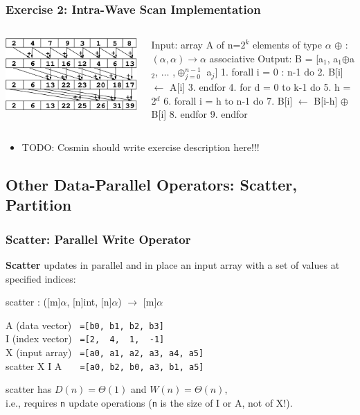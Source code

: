 \documentclass{beamer}
\renewcommand{\emph}[1]{\textcolor{CosGreen}{ #1}}
\newcommand{\emp}[1]{\textcolor{DikuRed}{ #1}}
\newcommand{\mymath}[1]{$ #1 $}
\newcommand{\myindx}[1]{_{#1}}
\newcommand{\myindu}[1]{^{#1}}
\begin{document}
\begin{frame}[fragile,t]
  \frametitle{Exercise 2: Intra-Wave Scan Implementation}

\begin{columns}
\includegraphics[height=15ex]{img/day3/incScanGPU} 
\begin{colorcode}
Input:  array A of n=\mymath{2\myindu{k}} elements
                       of type \mymath{\alpha}
        \mymath{\oplus} : \mymath{(\alpha,\alpha)\to\alpha} associative
Output: B = [a\mymath{\myindx{1}}, a\mymath{\myindx{1}}\mymath{\oplus}a\mymath{\myindx{2}}, \mymath{\ldots} ,\mymath{\oplus\myindx{j=0}\myindu{n-1}} a\mymath{\myindx{j}}]
1.  forall i = 0 : n-1 do
2.    B[i] \mymath{\leftarrow} A[i]
3.  endfor
4.  for d = 0 to k-1 do
5.    h = 2\mymath{\myindu{d}}
6.    forall i = h to n-1 do 
7.      B[i] \mymath{\leftarrow} B[i-h] \mymath{\oplus} B[i]
8.    endfor
9.  endfor
\end{colorcode}
\end{columns}

\begin{itemize}
    \item TODO: Cosmin should write exercise description here!!!
\end{itemize}

\end{frame}

\subsection{Other Data-Parallel Operators: Scatter, Partition}

\begin{frame}[fragile,t]
  \frametitle{Scatter: Parallel Write Operator}

{\bf Scatter} \emph{updates in parallel and in place} an input array with a set of values at specified indices:
\smallskip

\emph{scatter : ([m]$\alpha$, [n]int, [n]$\alpha$) $\rightarrow$ [m]$\alpha$}
\bigskip

A (data vector)    {\tt~=[b0, b1, b2, b3]}\\
I (index vector)   {\tt~=[2,~~4,~~1,~~-1]}\\
X (input array)    {\tt~=[a0,~a1,~a2,~a3,~a4,~a5]}\\
\emp{scatter X I A {\tt~~~=[a0,~b2,~b0,~a3,~b1,~a5]}}
\bigskip\pause

\emph{scatter} has $D(n)=\Theta(1)$ and $W(n)=\Theta(n)$,\\
i.e., requires {\tt n} update operations ({\tt n} is the size of I or A, not of X!).\bigskip

\end{frame}
\end{document}
